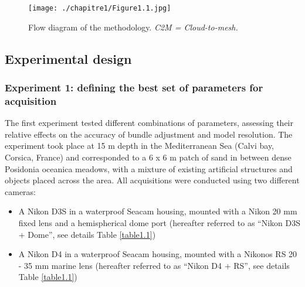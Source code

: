 \begin{figure}[H]
	\begin{center}
	\texttt{[image: ./chapitre1/Figure1.1.jpg]}
		\caption[Flow diagram of the methodology.]{Flow diagram of the methodology. \textit{C2M = Cloud-to-mesh.}}
	\label{figure1.1}
	
\end{center}
\end{figure}

\subsection{Experimental design}\label{chapitre1_2.1}

\subsubsection{Experiment 1: defining the best set of parameters for acquisition}\label{chapitre1_2.1.1}

The first experiment tested different combinations of parameters, assessing their relative effects on the accuracy of bundle adjustment and model resolution. The experiment took place at 15 m depth in the Mediterranean Sea (Calvi bay, Corsica, France) and corresponded to a 6 x 6 m patch of sand in between dense Posidonia oceanica meadows, with a mixture of existing artificial structures and objects placed across the area. All acquisitions were conducted using two different cameras: 

\begin{itemize}[leftmargin=*]
\item A Nikon D3S in a waterproof Seacam housing, mounted with a Nikon 20 mm fixed lens and a hemispherical dome port (hereafter referred to as “Nikon D3S + Dome”, see details Table \ref{table1.1})
\item A Nikon D4 in a waterproof Seacam housing, mounted with a Nikonos RS 20 - 35 mm marine lens (hereafter referred to as “Nikon D4 + RS”, see details Table \ref{table1.1})
\end{itemize}

